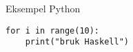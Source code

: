 \begin{frame}[fragile]{Eksempel Python}
\begin{verbatim}
for i in range(10):
    print("bruk Haskell")
\end{verbatim}
\end{frame}
%
%    
%    
%
%
%    
